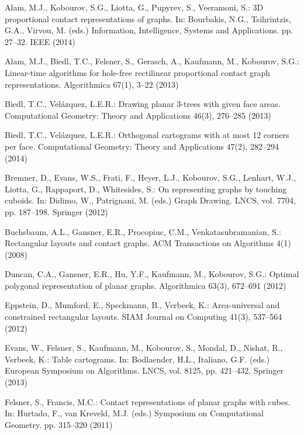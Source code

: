 \documentclass{llncs}
\begin{document}
{
\begin{small}
\begin{thebibliography}{10}
\providecommand{\url}[1]{\texttt{#1}}
\providecommand{\urlprefix}{URL }

Alam, M.J., Kobourov, S.G., Liotta, G., Pupyrev, S., Veeramoni, S.: {3D}
  proportional contact representations of graphs. In: Bourbakis, N.G.,
  Tsihrintzis, G.A., Virvou, M. (eds.) Information, Intelligence, Systems and
  Applications. pp. 27--32. {IEEE} (2014)

Alam, M.J., Biedl, T.C., Felsner, S., Gerasch, A., Kaufmann, M., Kobourov,
  S.G.: Linear-time algorithms for hole-free rectilinear proportional contact
  graph representations. Algorithmica  67(1),  3--22 (2013)

Biedl, T.C., Vel{\'{a}}zquez, L.E.R.: Drawing planar 3-trees with given face
  areas. Computational Geometry: Theory and Applications  46(3),  276--285
  (2013)

Biedl, T.C., Vel{\'{a}}zquez, L.E.R.: Orthogonal cartograms with at most 12
  corners per face. Computational Geometry: Theory and Applications  47(2),
  282--294 (2014)

Bremner, D., Evans, W.S., Frati, F., Heyer, L.J., Kobourov, S.G., Lenhart,
  W.J., Liotta, G., Rappaport, D., Whitesides, S.: On representing graphs by
  touching cuboids. In: Didimo, W., Patrignani, M. (eds.) Graph Drawing. LNCS,
  vol. 7704, pp. 187--198. Springer (2012)

Buchsbaum, A.L., Gansner, E.R., Procopiuc, C.M., Venkatasubramanian, S.:
  Rectangular layouts and contact graphs. ACM Transactions on Algorithms  4(1)
  (2008)

Duncan, C.A., Gansner, E.R., Hu, Y.F., Kaufmann, M., Kobourov, S.G.: Optimal
  polygonal representation of planar graphs. Algorithmica  63(3),  672--691
  (2012)

Eppstein, D., Mumford, E., Speckmann, B., Verbeek, K.: Area-universal and
  constrained rectangular layouts. SIAM Journal on Computing  41(3),  537--564
  (2012)

Evans, W., Felsner, S., Kaufmann, M., Kobourov, S., Mondal, D., Nishat, R.,
  Verbeek, K.: Table cartograms. In: Bodlaender, H.L., Italiano, G.F. (eds.)
  European Symposium on Algorithms. LNCS, vol. 8125, pp. 421--432. Springer
  (2013)

Felsner, S., Francis, M.C.: Contact representations of planar graphs with
  cubes. In: Hurtado, F., van Kreveld, M.J. (eds.) Symposium on Computational
  Geometry. pp. 315--320 (2011)


\end{thebibliography}
\end{small}}
\end{document}
